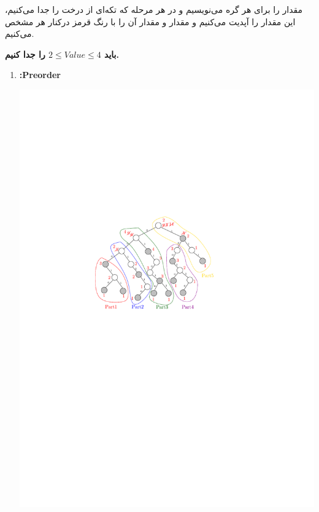 \begin{qsolve}
	مقدار  را برای هر گره می‌نویسیم و در هر مرحله که تکه‌ای از درخت را جدا می‌کنیم، این مقدار را آپدیت می‌کنیم و مقدار و مقدار آن را با رنگ قرمز درکنار هر  مشخص می‌کنیم.
	
	\textbf{باید $2\le Value \le 4 $ را جدا کنیم.}

	\begin{enumerate}
		\item 
		\textbf{:Preorder}
		
		\begin{center}
			\includegraphics*[width=0.7\linewidth]{pics/q10a.pdf}
		\end{center}
		
	\end{enumerate}
	
\end{qsolve}




